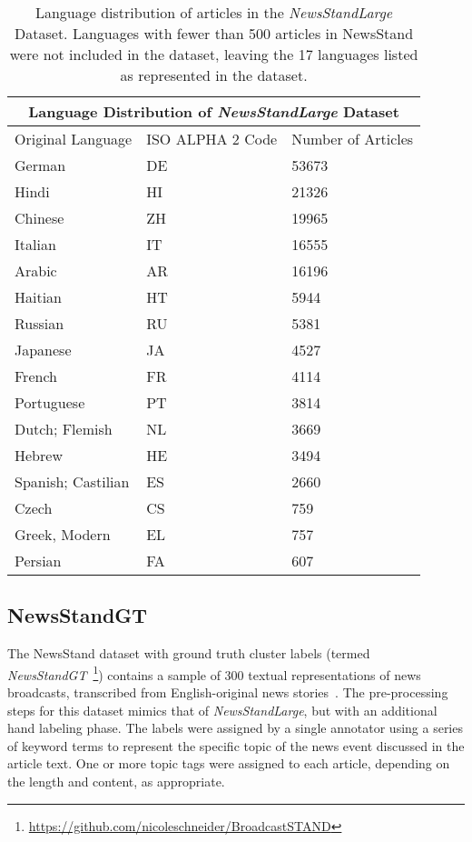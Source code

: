 \begin{table}[ht!]
\centering
\begin{tabular}{ p{2.5cm} p{2cm} p{1.5cm}  }
 \multicolumn{3}{c}{\textbf{Language Distribution of \emph{NewsStandLarge} Dataset}} \\
 \hline
 Original Language & ISO ALPHA 2 Code & Number of Articles\\
 \hline
 German             & DE     & 53673\\
 Hindi              & HI     & 21326\\
 Chinese            & ZH     & 19965\\
 Italian            & IT     & 16555\\
 Arabic             & AR     & 16196\\
 Haitian            & HT     & 5944\\
 Russian            & RU     & 5381\\
 Japanese           & JA     & 4527\\
 French             & FR     & 4114\\
 Portuguese         & PT     & 3814\\
 Dutch; Flemish     & NL     & 3669\\
 Hebrew             & HE     & 3494\\
 Spanish; Castilian & ES     & 2660\\
 Czech              & CS     & 759\\
 Greek, Modern      & EL     & 757\\
 Persian            & FA     & 607\\
\end{tabular}
\caption{Language distribution of articles in the \emph{NewsStandLarge} Dataset. Languages with fewer than 500 articles in NewsStand were not included in the dataset, leaving the 17 languages listed as represented in the dataset.}
\label{table:newsstandlarge-stats}
\end{table}





\subsection{NewsStandGT}


The NewsStand dataset with ground truth cluster labels (termed \emph{NewsStandGT}~\footnote{\url{https://github.com/nicoleschneider/BroadcastSTAND}}) contains a sample of 300 textual representations of news broadcasts, transcribed from English-original news stories~\cite{Zhang2023}.
The pre-processing steps for this dataset mimics that of \emph{NewsStandLarge}, but with an additional hand labeling phase.
The labels were assigned by a single annotator using a series of keyword terms to represent the specific topic of the news event discussed in the article text.
One or more topic tags were assigned to each article, depending on the length and content, as appropriate.


